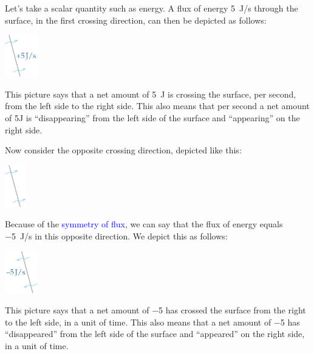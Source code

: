 \documentclass[a4paper,12pt,%
onecolumn,oneside,%
british%
]{memoir}
\renewcommand*{\|}[1][]{\nonscript\:#1\vert\nonscript\:\mathopen{}}
\newcommand*{\sect}{\S}%
\renewcommand*{\autoref}[2]{\sidepar{\vspace{-1ex}\footnotesize{\color{blue}\faIcon{%
angle-right%
}\enskip\sect~\ref{#1} page~\pageref{#1}}}\textcolor{blue}{#2}}
\begin{document}
Let's take a scalar quantity such as energy. A flux of energy \qty{+5}{J/s} through the surface, in the first crossing direction, can then be depicted as follows:\noprelistbreak
\begin{center}
  \medskip
  \includegraphics[height=5em]{images/flux_plus5J.jpg}
\end{center}
This picture says that a net amount of \qty{5}{J} is crossing the surface, per second, from the left side to the right side. This also means that per second a net amount of \num{5}{J} is \enquote{disappearing} from the left side of the surface and \enquote{appearing} on the right side.

\medskip

Now consider the opposite crossing direction, depicted like this:\noprelistbreak
\begin{center}
  \medskip
  \includegraphics[height=5em]{images/inv_surface_tilted_crossing.jpg}
\end{center}
Because of the \autoref{def:symmetryflux}{symmetry of flux}, we can say that the flux of energy equals \qty{-5}{J/s} in this opposite direction. We depict this as follows:\noprelistbreak
\begin{center}
  \medskip
  \includegraphics[height=5em]{images/inv_flux_plus5J.jpg}
\end{center}
This picture says that a net amount of \num{-5} has crossed the surface from the right to the left side, in a unit of time. This also means that a net amount of \num{-5} has \enquote{disappeared} from the left side of the surface and \enquote{appeared} on the right side, in a unit of time.
\end{document}
